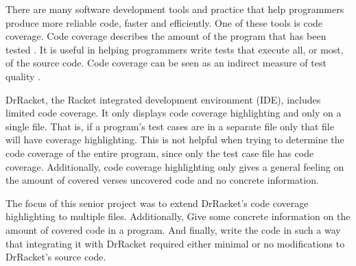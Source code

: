 There are many software development tools and practice that help programmers produce more reliable code, faster and efficiently. One of these tools is code coverage. Code coverage describes the amount of the program that has been tested \cite{lasse}. It is useful in helping programmers write tests that execute all, or most, of the source code. Code coverage can be seen as an indirect measure of test quality \cite{lasse}.

DrRacket, the Racket integrated development environment (IDE), includes limited code coverage. It only displays code coverage highlighting and only on a single file. That is, if a program's test cases are in a separate file only that file will have coverage highlighting. This is not helpful when trying to determine the code coverage of the entire program, since only the test case file has code coverage. Additionally, code coverage highlighting only gives a general feeling on the amount of covered verses uncovered code and no concrete information.

The focus of this senior project was to extend DrRacket's code coverage highlighting to multiple files. Additionally, Give some concrete information on the amount of covered code in a program. And finally, write the code in such a way that integrating it with DrRacket required either minimal or no modifications to DrRacket's source code.